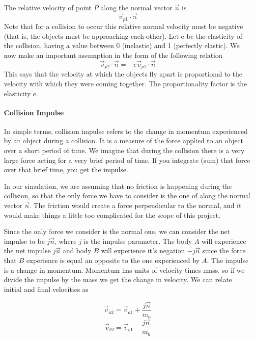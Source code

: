 The relative velocity of point $P$ along the normal vector $\vec n$ is
$$ \vec v_{p1} \cdot \vec n $$
Note that for a collision to occur this relative normal velocity must be
negative (that is, the objects must be approaching each other). Let e be the
elasticity of the collision, having a value between 0 (inelastic) and 1
(perfectly elastic). We now make an important assumption in the form of the
following relation
\begin{equation}
	\label{eq:vp2n}
	\vec v_{p2} \cdot \vec n = - e \vec v_{p1} \cdot \vec n
\end{equation}
This says that the velocity at which the objects fly apart is proportional to
the velocity with which they were coming together. The proportionality factor is
the elasticity $e$.

\paragraph{Collision Impulse} In simple terms, collision impulse refers to the
change in momentum experienced by an object during a collision. It is a measure
of the force applied to an object over a short period of time. We imagine that
during the collision there is a very large force acting for a very brief period
of time. If you integrate (sum) that force over that brief time, you get the
impulse.

In our simulation, we are assuming that no friction is happening during the
collision, so that the only force we have to consider is the one of along the
normal vector $\vec n$. The friction would create a force perpendicular to the
normal, and it would make things a little too complicated for the scope of this
project.

Since the only force we consider is the normal one, we can consider the net
impulse to be $j \vec n$, where $j$ is the impulse parameter. The body $A$ will
experience the net impulse $j \vec n$ and body $B$ will experience it's negation
$- j \vec n$ since the force that $B$ experience is equal an opposite to the one
experienced by $A$. The impulse is a change in momentum. Momentum has units of
velocity times mass, so if we divide the impulse by the mass we get the change
in velocity. We can relate initial and final velocities as

\begin{equation}
	\label{eq:va2}
	\vec v_{a2} = \vec v_{a1} +  \frac{j\vec n}{m_a}
\end{equation}
\begin{equation}
	\label{eq:vb2}
	\vec v_{b2} = \vec v_{b1} -  \frac{j\vec n}{m_b}
\end{equation}


